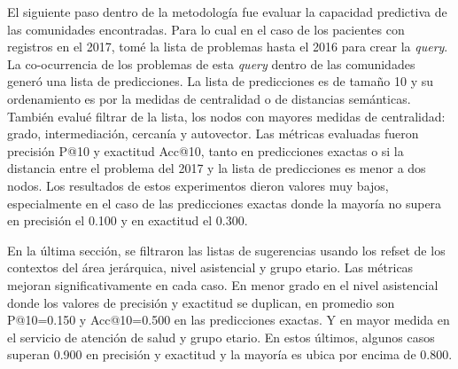 El siguiente paso dentro de la metodología fue evaluar la capacidad predictiva de las comunidades encontradas. Para lo cual en el caso de los pacientes con registros en el 2017, tomé la lista de problemas hasta el 2016 para crear la \textit{query}. La co-ocurrencia de los problemas de esta \textit{query} dentro de las comunidades generó una lista de predicciones. La lista de predicciones es de tamaño 10 y su ordenamiento es por la medidas de centralidad o de distancias semánticas. También evalué filtrar de la lista, los nodos con mayores medidas de centralidad: grado, intermediación, cercanía y autovector. Las métricas evaluadas fueron precisión P@10 y exactitud Acc@10, tanto en predicciones exactas o si la distancia entre el problema del 2017 y la lista de predicciones es menor a dos nodos. Los resultados de estos experimentos dieron valores muy bajos, especialmente en el caso de las predicciones exactas donde la mayoría no supera en precisión el \num{0.100} y en exactitud el \num{0.300}.

En la última sección, se filtraron las listas de sugerencias usando los \acrshort{refset} de los contextos del área jerárquica, nivel asistencial y grupo etario. Las métricas mejoran significativamente en cada caso. En menor grado en el nivel asistencial donde los valores de precisión y exactitud se duplican, en promedio son P@10=\num{0.150} y Acc@10=\num{0.500} en las predicciones exactas. Y en mayor medida en el servicio de atención de salud y grupo etario. En estos últimos, algunos casos superan \num{0.900} en precisión y exactitud y la mayoría es ubica por encima de \num{0.800}.

